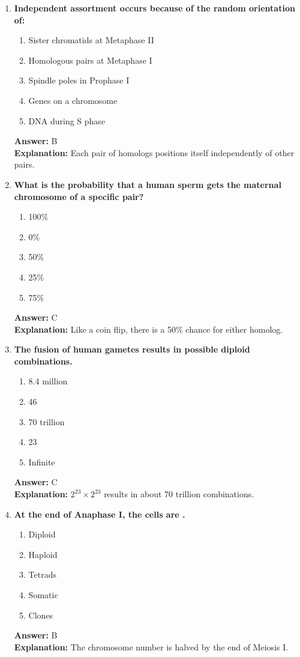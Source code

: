 \documentclass[11pt, a4paper]{article}
\begin{document}
\begin{enumerate}[leftmargin=*, label=\arabic*.]
\item \textbf{Independent assortment occurs because of the random orientation of:}
\begin{enumerate}[label=\Alph*.]
\item Sister chromatids at Metaphase II
\item Homologous pairs at Metaphase I
\item Spindle poles in Prophase I
\item Genes on a chromosome
\item DNA during S phase
\end{enumerate}
\textbf{Answer:} B \\
\textbf{Explanation:} Each pair of homologs positions itself independently of other pairs.

\item \textbf{What is the probability that a human sperm gets the maternal chromosome of a specific pair?}
\begin{enumerate}[label=\Alph*.]
\item 100\%
\item 0\%
\item 50\%
\item 25\%
\item 75\%
\end{enumerate}
\textbf{Answer:} C \\
\textbf{Explanation:} Like a coin flip, there is a 50\% chance for either homolog.

\item \textbf{The fusion of human gametes results in \underline{\hspace{1cm}} possible diploid combinations.}
\begin{enumerate}[label=\Alph*.]
\item 8.4 million
\item 46
\item 70 trillion
\item 23
\item Infinite
\end{enumerate}
\textbf{Answer:} C \\
\textbf{Explanation:} $2^{23} \times 2^{23}$ results in about 70 trillion combinations.

\item \textbf{At the end of Anaphase I, the cells are \underline{\hspace{1cm}}.}
\begin{enumerate}[label=\Alph*.]
\item Diploid
\item Haploid
\item Tetrads
\item Somatic
\item Clones
\end{enumerate}
\textbf{Answer:} B \\
\textbf{Explanation:} The chromosome number is halved by the end of Meiosis I.


\end{enumerate}
\end{document}
